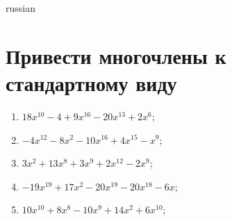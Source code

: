 \documentclass[a4paper]{article}
\begin{document}
\begin{otherlanguage*}{russian}

\section{Привести многочлены к стандартному виду}
\begin{enumerate}
\item $18x^10 - 4 + 9x^16 - 20x^13 + 2x^6$;
\item $-4x^12 - 8x^2 - 10x^16 + 4x^15 - x^9$;
\item $3x^2 + 13x^8 + 3x^9 + 2x^12 - 2x^9$;
\item $-19x^19 + 17x^2 - 20x^19 - 20x^18 - 6x$;
\item $10x^10 + 8x^8 - 10x^9 + 14x^2 + 6x^10$;
\end{enumerate}
\end{otherlanguage*}
\end{document}
